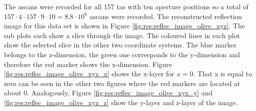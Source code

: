 The \acp{ascan} were recorded for all 157 \ac{tas} with ten aperture positions so a total of $157\cdot4\cdot157\cdot9\cdot10 = 8.8\cdot10^6$ \acp{ascan} were recorded. The reconstructed reflection image for this data set is shown in Figure \ref{fig:res:reflec_image_olive_xyz}. The sub plots each show a slice through the image. The coloured lines in each plot show the selected slice in the other two coordinate systems. The blue marker belongs to the z-dimension, the green one corresponds to the y-dimension and therefore the red marker shows the x-dimension. Figure \ref{fig:res:reflec_image_olive_xyz_x} shows the x-layer for $x = 0$. That x is equal to zero can be seen in the other two figures where the red markers are located at about 0. Analogously, Figure \ref{fig:res:reflec_image_olive_xyz_y} and  \ref{fig:res:reflec_image_olive_xyz_z} show the y-layer and z-layer of the image.


